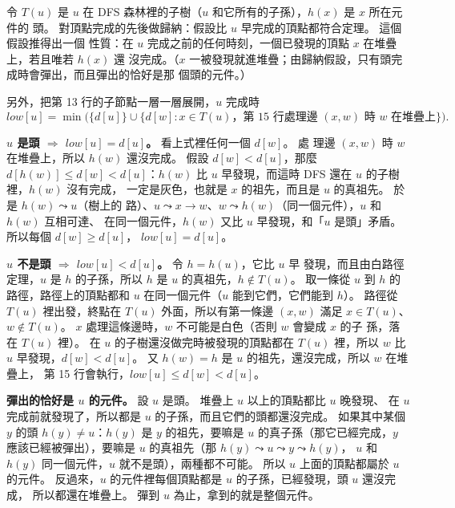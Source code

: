 \begin{whybox}
令 $T(u)$ 是 $u$ 在 DFS 森林裡的子樹（$u$ 和它所有的子孫），$h(x)$ 是 $x$ 所在元件的
頭。 對頂點完成的先後做歸納：假設比 $u$ 早完成的頂點都符合定理。 這個假設推得出一個
性質：在 $u$ 完成之前的任何時刻，一個已發現的頂點 $x$ 在堆疊上，若且唯若 $h(x)$ 還
沒完成。（$x$ 一被發現就進堆疊；由歸納假設，只有頭完成時會彈出，而且彈出的恰好是那
個頭的元件。）

另外，把第 13 行的子節點一層一層展開，$u$ 完成時
\[
\mathit{low}[u] = \min\bigl(\{d[u]\} \cup \{d[w] : x \in T(u)，\text{第 15 行處理邊 } (x, w) \text{ 時 } w \text{ 在堆疊上}\}\bigr).
\]

\textbf{$u$ 是頭 $\Rightarrow$ $\mathit{low}[u] = d[u]$。} 看上式裡任何一個 $d[w]$。 處
理邊 $(x, w)$ 時 $w$ 在堆疊上，所以 $h(w)$ 還沒完成。 假設 $d[w] < d[u]$，那麼 $d[h(w)]
\le d[w] < d[u]$：$h(w)$ 比 $u$ 早發現，而這時 DFS 還在 $u$ 的子樹裡，$h(w)$ 沒有完成，
一定是灰色，也就是 $x$ 的祖先，而且是 $u$ 的真祖先。 於是 $h(w) \leadsto u$（樹上的
路）、$u \leadsto x \to w$、$w \leadsto h(w)$（同一個元件），$u$ 和 $h(w)$ 互相可達、
在同一個元件，$h(w)$ 又比 $u$ 早發現，和「$u$ 是頭」矛盾。 所以每個 $d[w] \ge d[u]$，
$\mathit{low}[u] = d[u]$。

\textbf{$u$ 不是頭 $\Rightarrow$ $\mathit{low}[u] < d[u]$。} 令 $h = h(u)$，它比 $u$ 早
發現，而且由白路徑定理，$u$ 是 $h$ 的子孫，所以 $h$ 是 $u$ 的真祖先，$h \notin T(u)$。
取一條從 $u$ 到 $h$ 的路徑，路徑上的頂點都和 $u$ 在同一個元件（$u$ 能到它們，它們能到
$h$）。 路徑從 $T(u)$ 裡出發，終點在 $T(u)$ 外面，所以有第一條邊 $(x, w)$ 滿足 $x \in
T(u)$、$w \notin T(u)$。 $x$ 處理這條邊時，$w$ 不可能是白色（否則 $w$ 會變成 $x$ 的子
孫，落在 $T(u)$ 裡）。 在 $u$ 的子樹還沒做完時被發現的頂點都在 $T(u)$ 裡，所以 $w$ 比
$u$ 早發現，$d[w] < d[u]$。 又 $h(w) = h$ 是 $u$ 的祖先，還沒完成，所以 $w$ 在堆疊上，
第 15 行會執行，$\mathit{low}[u] \le d[w] < d[u]$。

\textbf{彈出的恰好是 $u$ 的元件。} 設 $u$ 是頭。 堆疊上 $u$ 以上的頂點都比 $u$ 晚發現、
在 $u$ 完成前就發現了，所以都是 $u$ 的子孫，而且它們的頭都還沒完成。 如果其中某個
$y$ 的頭 $h(y) \ne u$：$h(y)$ 是 $y$ 的祖先，要嘛是 $u$ 的真子孫（那它已經完成，$y$
應該已經被彈出），要嘛是 $u$ 的真祖先（那 $h(y) \leadsto u \leadsto y \leadsto h(y)$，
$u$ 和 $h(y)$ 同一個元件，$u$ 就不是頭），兩種都不可能。 所以 $u$ 上面的頂點都屬於
$u$ 的元件。 反過來，$u$ 的元件裡每個頂點都是 $u$ 的子孫，已經發現，頭 $u$ 還沒完成，
所以都還在堆疊上。 彈到 $u$ 為止，拿到的就是整個元件。
\end{whybox}


